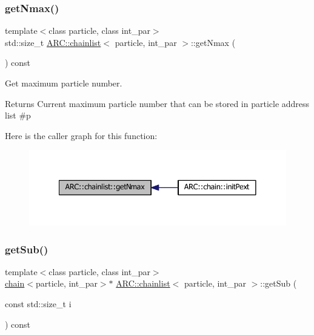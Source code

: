 \subsubsection{\texorpdfstring{get\+Nmax()}{getNmax()}}
{\footnotesize\ttfamily template$<$class particle, class int\+\_\+par$>$ \\
std\+::size\+\_\+t \hyperlink{classARC_1_1chainlist}{A\+R\+C\+::chainlist}$<$ particle, int\+\_\+par $>$\+::get\+Nmax (\begin{DoxyParamCaption}{ }\end{DoxyParamCaption}) const\hspace{0.3cm}{\ttfamily [inline]}}



Get maximum particle number. 

\begin{DoxyReturn}{Returns}
Current maximum particle number that can be stored in particle address list \#p 
\end{DoxyReturn}
Here is the caller graph for this function\+:
\nopagebreak
\begin{figure}[H]
\begin{center}
\leavevmode
\includegraphics[width=341pt]{classARC_1_1chainlist_a60cec732dad13b91f7835fc0cd604e5f_icgraph}
\end{center}
\end{figure}
\hypertarget{classARC_1_1chainlist_a4ded066f2323845befd92b1109ccdeb0}{}\label{classARC_1_1chainlist_a4ded066f2323845befd92b1109ccdeb0} 
\subsubsection{\texorpdfstring{get\+Sub()}{getSub()}}
{\footnotesize\ttfamily template$<$class particle, class int\+\_\+par$>$ \\
\hyperlink{classARC_1_1chain}{chain}$<$particle, int\+\_\+par$>$$\ast$ \hyperlink{classARC_1_1chainlist}{A\+R\+C\+::chainlist}$<$ particle, int\+\_\+par $>$\+::get\+Sub (\begin{DoxyParamCaption}\item[{const std\+::size\+\_\+t}]{i }\end{DoxyParamCaption}) const\hspace{0.3cm}{\ttfamily [inline]}}



